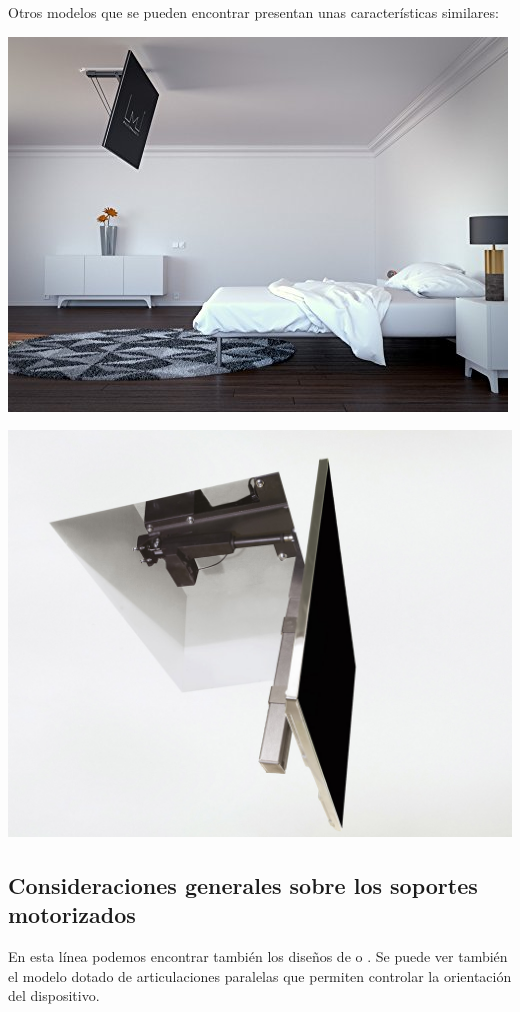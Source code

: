  \vspace{0.1cm}
Otros modelos que se pueden encontrar presentan unas características similares:

\begin{minipage}{0.5\textwidth}
   \includegraphics[width=0.8\linewidth]{figuras/Imagenes_EstadoArte/not_valid_2.jpg}
\end{minipage}
\begin{minipage}{0.5\textwidth}
   \includegraphics[width=0.8\linewidth]{figuras/Imagenes_EstadoArte/not_valid_3.jpg}
\end{minipage}
 \subsection{Consideraciones generales sobre los soportes motorizados}

    En esta línea podemos encontrar también los diseños de \cite{Chung2009} o \cite{PatentChang2008}. Se puede ver también el modelo \cite{Chung2009} dotado de articulaciones paralelas que permiten controlar la orientación del dispositivo.
    \\
    
